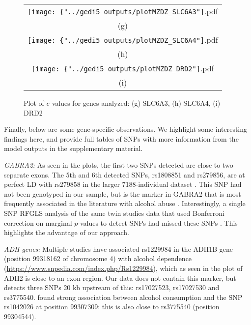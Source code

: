 \begin{figure}
\begin{center}

\begin{tabular}{c}
		\texttt{[image: \{"../gedi5 outputs/plotMZDZ\_SLC6A3"]}.pdf}\\
		(g)\\
		\texttt{[image: \{"../gedi5 outputs/plotMZDZ\_SLC6A4"]}.pdf} \\
		(h)\\	
		\texttt{[image: \{"../gedi5 outputs/plotMZDZ\_DRD2"]}.pdf}\\
		(i)\\	
\end{tabular}

\caption{Plot of $e$-values for genes analyzed: (g) SLC6A3, (h) SLC6A4, (i) DRD2}
\label{fig:geneplot3}

\end{center}
\end{figure}

Finally, below are some gene-specific observations. We highlight some interesting findings here, and provide full tables of SNPs with more information from the model outputs in the supplementary material.

{\it GABRA2:} As seen in the plots, the first two SNPs detected are close to two separate exons. The 5th and 6th detected SNPs, rs1808851 and rs279856, are at perfect LD with rs279858 in the larger 7188-individual dataset \citep{IronsThesis12}. This SNP had not been genotyped in our sample, but is the marker in GABRA2 that is most frequently associated in the literature with alcohol abuse \citep{CuiEtal12}. Interestingly, a single SNP RFGLS analysis of the same twin studies data that used Bonferroni correction on marginal $p$-values to detect SNPs had missed these SNPs \citep{IronsThesis12}. This highlights the advantage of our approach.

{\it ADH genes:} Multiple studies have associated rs1229984 in the ADH1B gene (position 99318162 of chromosome 4) with alcohol dependence (\url{https://www.snpedia.com/index.php/Rs1229984}), which as seen in the plot of ADH2 is close to an exon region. Our data does not contain this marker, but detects three SNPs 20 kb upstream of this: rs17027523, rs17027530 and rs3775540. \cite{MacgregorEtal08} found strong association between alcohol consumption and the SNP rs1042026 at position 99307309: this is also close to rs3775540 (position 99304544).

